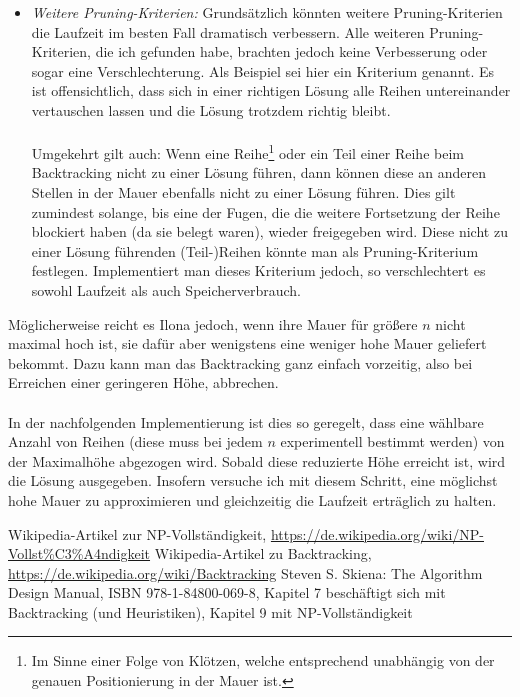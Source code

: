 \documentclass[a4paper, notitlepage, 12pt]{scrartcl}
\begin{document}
\begin{itemize}
\item \textit{Weitere Pruning-Kriterien:} Grundsätzlich könnten weitere Pruning-Kriterien die Laufzeit im besten Fall dramatisch verbessern. Alle weiteren Pruning-Kriterien, die ich gefunden habe, brachten jedoch keine Verbesserung oder sogar eine Verschlechterung. Als Beispiel sei hier ein Kriterium genannt. Es ist offensichtlich, dass sich in einer richtigen Lösung alle Reihen untereinander vertauschen lassen und die Lösung trotzdem richtig bleibt. \\ \\ Umgekehrt gilt auch: Wenn eine Reihe\footnote{Im Sinne einer Folge von Klötzen, welche entsprechend unabhängig von der genauen Positionierung in der Mauer ist.} oder ein Teil einer Reihe beim Backtracking nicht zu einer Lösung führen, dann können diese an anderen Stellen in der Mauer ebenfalls nicht zu einer Lösung führen. Dies gilt zumindest solange, bis eine der Fugen, die die weitere Fortsetzung der Reihe blockiert haben (da sie belegt waren), wieder freigegeben wird. Diese nicht zu einer Lösung führenden (Teil-)Reihen könnte man als Pruning-Kriterium festlegen. Implementiert man dieses Kriterium jedoch, so verschlechtert es sowohl Laufzeit als auch Speicherverbrauch.
\end{itemize}
\newpage
Möglicherweise reicht es Ilona jedoch, wenn ihre Mauer für größere $n$ nicht maximal hoch ist, sie dafür aber wenigstens eine weniger hohe Mauer geliefert bekommt. Dazu kann man das Backtracking ganz einfach vorzeitig, also bei Erreichen einer geringeren Höhe, abbrechen. \\ \\ In der nachfolgenden Implementierung ist dies so geregelt, dass eine wählbare Anzahl von Reihen (diese muss bei jedem $n$ experimentell bestimmt werden) von der Maximalhöhe abgezogen wird. Sobald diese reduzierte Höhe erreicht ist, wird die Lösung ausgegeben. Insofern versuche ich mit diesem Schritt, eine möglichst hohe Mauer zu approximieren und gleichzeitig die Laufzeit erträglich zu halten.
\begin{thebibliography}{xx}
 Wikipedia-Artikel zur NP-Vollständigkeit, \url{https://de.wikipedia.org/wiki/NP-Vollst\%C3\%A4ndigkeit}
 Wikipedia-Artikel zu Backtracking, \url{https://de.wikipedia.org/wiki/Backtracking}
 Steven S. Skiena: The Algorithm Design Manual, ISBN 978-1-84800-069-8, Kapitel 7 beschäftigt sich mit Backtracking (und Heuristiken), Kapitel 9 mit NP-Vollständigkeit
\end{thebibliography}
\end{document}
